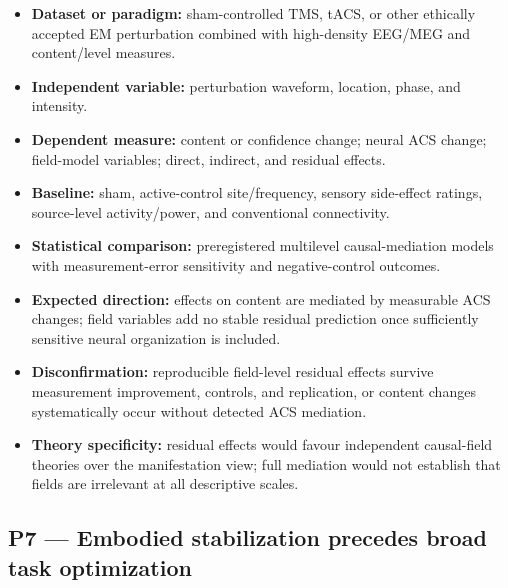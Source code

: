 \documentclass[
  11pt,
  a4paper,
]{article}
\providecommand{\tightlist}{%
  \setlength{\itemsep}{0pt}\setlength{\parskip}{0pt}}
\begin{document}
\begin{itemize}
\tightlist
\item
  \textbf{Dataset or paradigm:} sham-controlled TMS, tACS, or other
  ethically accepted EM perturbation combined with high-density EEG/MEG
  and content/level measures.
\item
  \textbf{Independent variable:} perturbation waveform, location, phase,
  and intensity.
\item
  \textbf{Dependent measure:} content or confidence change; neural ACS
  change; field-model variables; direct, indirect, and residual effects.
\item
  \textbf{Baseline:} sham, active-control site/frequency, sensory
  side-effect ratings, source-level activity/power, and conventional
  connectivity.
\item
  \textbf{Statistical comparison:} preregistered multilevel
  causal-mediation models with measurement-error sensitivity and
  negative-control outcomes.
\item
  \textbf{Expected direction:} effects on content are mediated by
  measurable ACS changes; field variables add no stable residual
  prediction once sufficiently sensitive neural organization is
  included.
\item
  \textbf{Disconfirmation:} reproducible field-level residual effects
  survive measurement improvement, controls, and replication, or content
  changes systematically occur without detected ACS mediation.
\item
  \textbf{Theory specificity:} residual effects would favour independent
  causal-field theories over the manifestation view; full mediation
  would not establish that fields are irrelevant at all descriptive
  scales.
\end{itemize}

\subsection{P7 --- Embodied stabilization precedes broad task
optimization}\label{p7-embodied-stabilization-precedes-broad-task-optimization}
\end{document}
